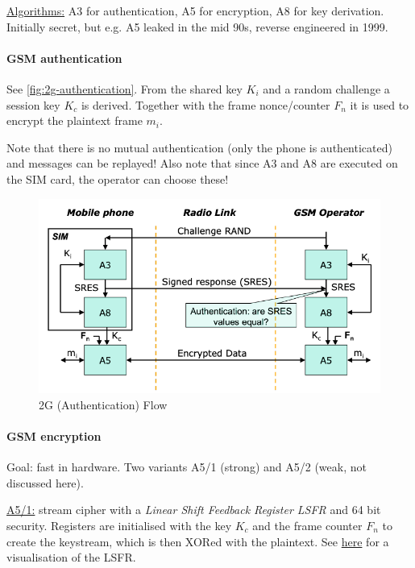 \underline{Algorithms:}
A3 for authentication, A5 for encryption, A8 for key derivation.
Initially secret, but e.g. A5 leaked in the mid 90s, reverse engineered in 1999.

\paragraph{GSM authentication}
See \autoref{fig:2g-authentication}.
From the shared key $K_i$ and a random challenge a session key $K_c$ is derived.
Together with the frame nonce/counter $F_n$ it is used to encrypt the plaintext frame $m_i$.

Note that there is no mutual authentication (only the phone is authenticated) and messages can be replayed!
Also note that since A3 and A8 are executed on the SIM card, the operator can choose these!

\begin{figure}
	\centering
	\includegraphics[scale=0.5]{images/10-2g-authentication.png}
	\caption{2G (Authentication) Flow}
	\label{fig:2g-authentication}
\end{figure}

\paragraph{GSM encryption}
Goal: fast in hardware.
Two variants A5/1 (strong) and A5/2 (weak, not discussed here).

\underline{A5/1:} stream cipher with a \textit{Linear Shift Feedback Register LSFR} and 64 bit security.
Registers are initialised with the key $K_c$ and the frame counter $F_n$ to create the keystream, which is then XORed with the plaintext.
See \href{https://web.archive.org/web/20120326211404/http:/l-system.net.pl/crypto/A5\_1\_stream\_cipher.svg}{here} for a visualisation of the LSFR.

